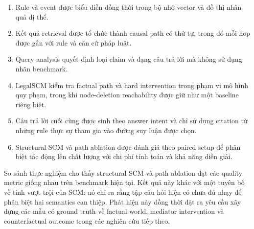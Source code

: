 \begin{enumerate}
    \item Rule và event được biểu diễn đồng thời trong bộ nhớ vector và đồ
    thị nhân quả dị thể.

    \item Kết quả retrieval được tổ chức thành causal path có thứ tự, trong
    đó mỗi hop được gắn với rule và căn cứ pháp luật.

    \item Query analysis quyết định loại claim và dạng câu trả lời mà không
    sử dụng nhãn benchmark.

    \item LegalSCM kiểm tra factual path và hard intervention trong phạm vi
    mô hình quy phạm, trong khi node-deletion reachability được giữ như một
    baseline riêng biệt.

    \item Câu trả lời cuối cùng được sinh theo answer intent và chỉ sử dụng
    citation từ những rule thực sự tham gia vào đường suy luận được chọn.

    \item Structural SCM và path ablation được đánh giá theo paired setup để
    phân biệt tác động lên chất lượng với chi phí tính toán và khả năng diễn
    giải.
\end{enumerate}

So sánh thực nghiệm cho thấy structural SCM và path ablation đạt các quality
metric giống nhau trên benchmark hiện tại. Kết quả này khác với một tuyên
bố về tính vượt trội của SCM: nó chỉ ra rằng tập câu hỏi hiện có chưa đủ
nhạy để phân biệt hai semantics can thiệp. Phát hiện này đồng thời đặt ra
yêu cầu xây dựng các mẫu có ground truth về factual world, mediator
intervention và counterfactual outcome trong các nghiên cứu tiếp theo.

